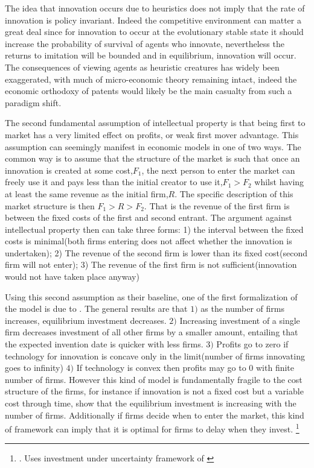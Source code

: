\documentclass[12pt]{article}
\numberwithin{equation}{section}
\begin{document}
The idea that innovation occurs due to heuristics does not imply that the rate of innovation is policy invariant. Indeed the competitive environment can matter a great deal since for innovation to occur at the evolutionary stable state it should increase the probability of survival of agents who innovate, nevertheless the returns to imitation will be bounded and in equilibrium, innovation will occur.\cite{Winter1993} The consequences of viewing agents as heuristic creatures has widely been exaggerated, with much of micro-economic theory remaining intact, indeed the economic orthodoxy of patents would likely be the main casualty from such a paradigm shift. \cite{becker1962irrational}



The second fundamental assumption of intellectual property is that being first to market has a very limited effect on profits, or weak first mover advantage. This assumption can seemingly manifest in economic models in one of two ways. The common way is to assume that the structure of the market is such that once an innovation is created at some cost,$F_1$, the next person to enter the market can freely use it and pays less than the initial creator to use it,$F_1>F_2$ whilst having at least the same revenue as the initial firm,$R$. The specific description of this market structure is then $F_1>R>F_2$. That is the revenue of the first firm is between the fixed costs of the first and second entrant. The argument against intellectual property then can take three forms: 1) the interval between the fixed costs is minimal(both firms entering does not affect whether the innovation is undertaken); 2) The revenue of the second firm is lower than its fixed cost(second firm will not enter); 3) The revenue of the first firm is not sufficient(innovation would not have taken place anyway)

Using this second assumption as their baseline, one of the first formalization of the model is due to \cite{Loury1979}. The general results are that $1)$ as the number of firms increases, equilibrium investment decreases. $2)$ Increasing investment of a single firm decreases investment of all other firms by a smaller amount, entailing that the expected invention date is quicker with less firms. $3)$ Profits go to zero if technology for innovation is concave only in the limit(number of firms innovating goes to infinity) $4)$ If technology is convex then profits may go to 0 with finite number of firms. However this kind of model is fundamentally fragile to the cost structure of the firms, for instance if innovation is not a fixed cost but a variable cost through time, \cite{lee1980market} show that the equilibrium investment is increasing with the number of firms. Additionally if firms decide when to enter the market, this kind of framework can imply that it is optimal for firms to delay when they invest. \footnote{\cite{Weeds2002}. Uses investment under uncertainty framework of \cite{dixit1994investment}}
\end{document}
